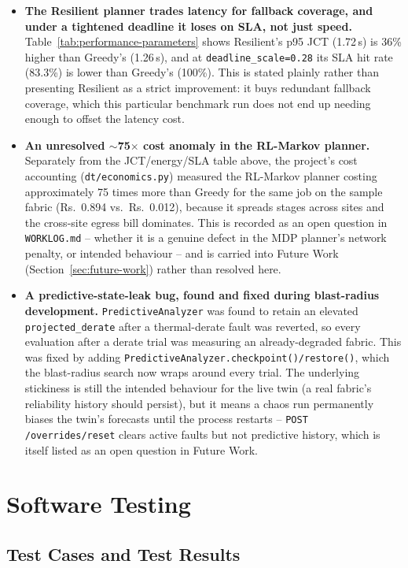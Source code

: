 \documentclass[12pt,a4]{report}
\begin{document}
\begin{itemize}
    \item \textbf{The Resilient planner trades latency for fallback coverage, and under a tightened deadline it loses on SLA, not just speed.} Table~\ref{tab:performance-parameters} shows Resilient's p95 JCT (1.72\,s) is 36\% higher than Greedy's (1.26\,s), and at \texttt{deadline\_scale=0.28} its SLA hit rate (83.3\%) is lower than Greedy's (100\%). This is stated plainly rather than presenting Resilient as a strict improvement: it buys redundant fallback coverage, which this particular benchmark run does not end up needing enough to offset the latency cost.
    \item \textbf{An unresolved $\sim$75$\times$ cost anomaly in the RL-Markov planner.} Separately from the JCT/energy/SLA table above, the project's cost accounting (\texttt{dt/economics.py}) measured the RL-Markov planner costing approximately 75 times more than Greedy for the same job on the sample fabric (Rs.~0.894 vs.\ Rs.~0.012), because it spreads stages across sites and the cross-site egress bill dominates. This is recorded as an open question in \texttt{WORKLOG.md} -- whether it is a genuine defect in the MDP planner's network penalty, or intended behaviour -- and is carried into Future Work (Section~\ref{sec:future-work}) rather than resolved here.
    \item \textbf{A predictive-state-leak bug, found and fixed during blast-radius development.} \texttt{PredictiveAnalyzer} was found to retain an elevated \texttt{projected\_derate} after a thermal-derate fault was reverted, so every evaluation after a derate trial was measuring an already-degraded fabric. This was fixed by adding \texttt{PredictiveAnalyzer.checkpoint()/restore()}, which the blast-radius search now wraps around every trial. The underlying stickiness is still the intended behaviour for the live twin (a real fabric's reliability history should persist), but it means a chaos run permanently biases the twin's forecasts until the process restarts -- \texttt{POST /overrides/reset} clears active faults but not predictive history, which is itself listed as an open question in Future Work.
\end{itemize}

 \section{Software Testing}
  \subsection{Test Cases and Test Results}
\end{document}
